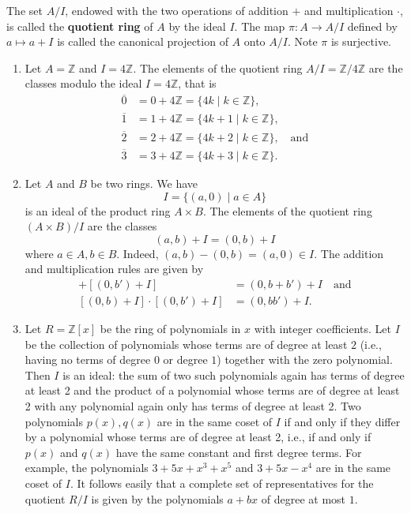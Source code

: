 \documentclass[11pt,a4paper]{article}
\begin{document}
The set \( A / I \), endowed with the two operations of addition \(+\) and multiplication \(\cdot\), is called the \textbf{quotient ring} of \( A \) by the ideal \( I \).
The map \(\pi \colon A\to A/I\) defined by \(a\mapsto a+I\) is called the canonical projection of \(A\) onto \(A/I\).
Note \(\pi\) is surjective.

\begin{exa}
\begin{enumerate}[label=(\roman*)]
\item Let \( A = \mathbb{Z} \) and \( I = 4\mathbb{Z} \). The elements of the quotient ring \( A / I = \mathbb{Z} / 4\mathbb{Z} \)
are the classes modulo the ideal \( I = 4\mathbb{Z} \), that is
\begin{align*}
\overline{0} &= 0 + 4\mathbb{Z} = \{4k \mid k \in \mathbb{Z}\},\\
\overline{1} &= 1 + 4\mathbb{Z} = \{4k + 1 \mid k \in \mathbb{Z}\},\\
\overline{2} &= 2 + 4\mathbb{Z} = \{4k + 2 \mid k \in \mathbb{Z}\},\quad\text{and}\\
\overline{3} &= 3 + 4\mathbb{Z} = \{4k + 3 \mid k \in \mathbb{Z}\}.
\end{align*} 
\item Let \( A \) and \( B \) be two rings. We have 
\[
I = \{(a, 0) \mid a \in A\}
\]
is an ideal of the product ring \( A \times B \). The elements of the quotient ring \( (A \times B)/I \) are the classes
\[
(a, b) + I = (0, b) + I
\]
where \( a \in A, b \in B \). Indeed, \( (a, b) - (0, b) = (a, 0) \in I \). The addition and multiplication rules are given by
\begin{align*}
    [(0, b) + I] + [(0, b') + I] &= (0, b + b') + I\quad\text{and}\\
    [(0, b) + I] \cdot [(0, b') + I] &= (0, bb') + I.
\end{align*} 

\item Let $R=\mathbb{Z}[x]$ be the ring of polynomials in $x$ with integer coefficients. Let $I$ be the collection of polynomials whose terms are of degree at least \(2\) (i.e., having no terms of degree 0 or degree \(1\)) together with the zero polynomial. Then $I$ is an ideal: the sum of two such polynomials again has terms of degree at least 2 and the product of a polynomial whose terms are of degree at least 2 with any polynomial again only has terms of degree at least 2. Two polynomials $p(x), q(x)$ are in the same coset of $I$ if and only if they differ by a polynomial whose terms are of degree at least 2, i.e., if and only if $p(x)$ and $q(x)$ have the same constant and first degree terms. For example, the polynomials $3+5 x+x^3+x^5$ and $3+5 x-x^4$ are in the same coset of \(I\). It follows easily that a complete set of representatives for the quotient $R / I$ is given by the polynomials $a+b x$ of degree at most \(1\).


\end{enumerate}
\end{exa}
\end{document}
